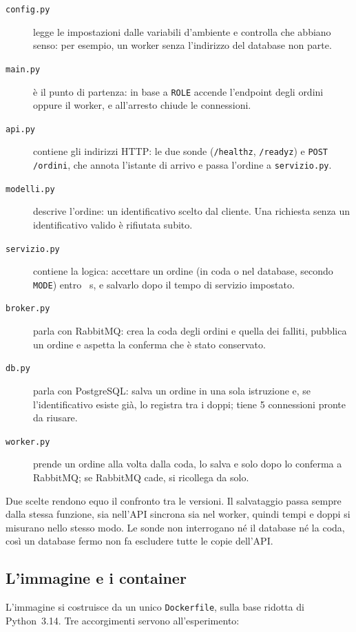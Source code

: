 \begin{description}
  \item[\texttt{config.py}] legge le impostazioni dalle variabili d'ambiente e controlla che abbiano senso: per esempio, un worker senza l'indirizzo del database non parte.
  \item[\texttt{main.py}] è il punto di partenza: in base a \texttt{ROLE} accende l'endpoint degli ordini oppure il worker, e all'arresto chiude le connessioni.
  \item[\texttt{api.py}] contiene gli indirizzi HTTP: le due sonde (\texttt{/healthz}, \texttt{/readyz}) e \texttt{POST /ordini}, che annota l'istante di arrivo e passa l'ordine a \texttt{servizio.py}.
  \item[\texttt{modelli.py}] descrive l'ordine: un identificativo scelto dal cliente. Una richiesta senza un identificativo valido è rifiutata subito.
  \item[\texttt{servizio.py}] contiene la logica: accettare un ordine (in coda o nel database, secondo \texttt{MODE}) entro ~s, e salvarlo dopo il tempo di servizio impostato.
  \item[\texttt{broker.py}] parla con RabbitMQ: crea la coda degli ordini e quella dei falliti, pubblica un ordine e aspetta la conferma che è stato conservato.
  \item[\texttt{db.py}] parla con PostgreSQL: salva un ordine in una sola istruzione e, se l'identificativo esiste già, lo registra tra i doppi; tiene 5 connessioni pronte da riusare.
  \item[\texttt{worker.py}] prende un ordine alla volta dalla coda, lo salva e solo dopo lo conferma a RabbitMQ; se RabbitMQ cade, si ricollega da solo.
\end{description}

Due scelte rendono equo il confronto tra le versioni. Il salvataggio passa sempre dalla stessa funzione, sia nell'API sincrona sia nel worker, quindi tempi e doppi si misurano nello stesso modo. Le sonde non interrogano né il database né la coda, così un database fermo non fa escludere tutte le copie dell'API.

\subsection{L'immagine e i container}

L'immagine si costruisce da un unico \texttt{Dockerfile}, sulla base ridotta di Python~3.14. Tre accorgimenti servono all'esperimento:

